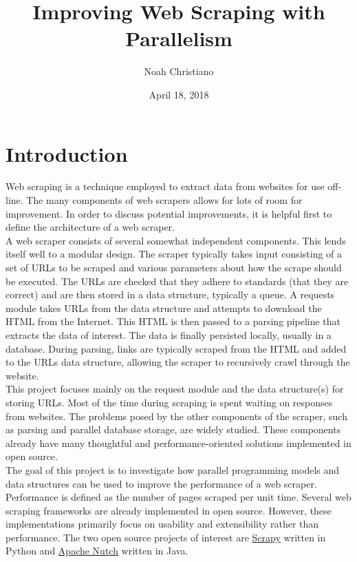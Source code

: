 \documentclass[11pt]{article}
\begin{document}
\title{Improving Web Scraping with Parallelism}
\author{Noah Christiano}
\date{April 18, 2018}
\maketitle

\section{Introduction}

Web scraping is a technique employed to extract data from websites for use off-line. The many components of web scrapers allows for lots of room for improvement. In order to discuss potential improvements, it is helpful first to define the architecture of a web scraper. \\

A web scraper consists of several somewhat independent components. This lends itself well to a modular design. The scraper typically takes input consisting of a set of URLs to be scraped and various parameters about how the scrape should be executed. The URLs are checked that they adhere to standards (that they are correct) and are then stored in a data structure, typically a queue. A requests module takes URLs from the data structure and attempts to download the HTML from the Internet. This HTML is then passed to a parsing pipeline that extracts the data of interest. The data is finally persisted locally, usually in a database. During parsing, links are typically scraped from the HTML and added to the URLs data structure, allowing the scraper to recursively crawl through the website. \\

This project focuses mainly on the request module and the data structure(s) for storing URLs. Most of the time during scraping is spent waiting on responses from websites. The problems posed by the other components of the scraper, such as parsing and parallel database storage, are widely studied. These components already have many thoughtful and performance-oriented solutions implemented in open source. \\

The goal of this project is to investigate how parallel programming models and data structures can be used to improve the performance of a web scraper. Performance is defined as the number of pages scraped per unit time. Several web scraping frameworks are already implemented in open source. However, these implementations primarily focus on usability and extensibility rather than performance. The two open source projects of interest are \href{https://scrapy.org/}{Scrapy} written in Python and \href{http://nutch.apache.org/}{Apache Nutch} written in Java.
\end{document}
